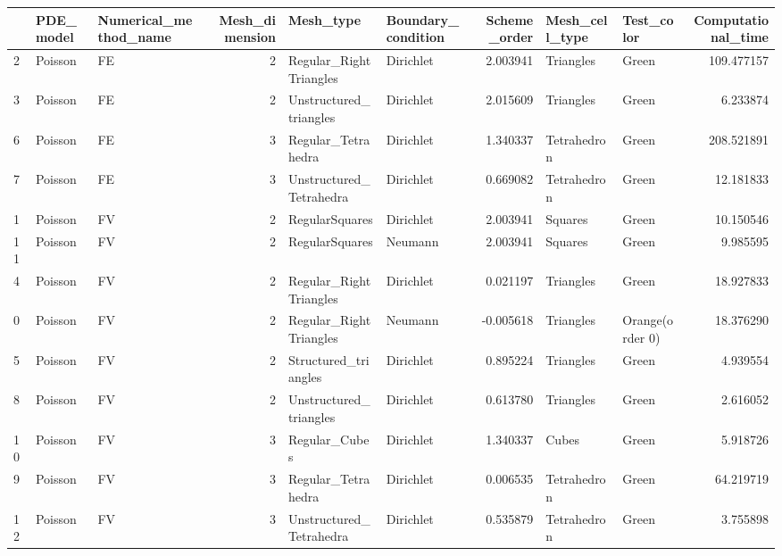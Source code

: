 \begin{tabular}{lllrllrllr}
\toprule
{} & PDE\_model & Numerical\_method\_name &  Mesh\_dimension &                Mesh\_type & Boundary\_condition &  Scheme\_order & Mesh\_cell\_type &       Test\_color &  Computational\_time \\
\midrule
2  &   Poisson &                    FE &               2 &   Regular\_RightTriangles &          Dirichlet &      2.003941 &      Triangles &            Green &          109.477157 \\
3  &   Poisson &                    FE &               2 &   Unstructured\_triangles &          Dirichlet &      2.015609 &      Triangles &            Green &            6.233874 \\
6  &   Poisson &                    FE &               3 &       Regular\_Tetrahedra &          Dirichlet &      1.340337 &    Tetrahedron &            Green &          208.521891 \\
7  &   Poisson &                    FE &               3 &  Unstructured\_Tetrahedra &          Dirichlet &      0.669082 &    Tetrahedron &            Green &           12.181833 \\
1  &   Poisson &                    FV &               2 &           RegularSquares &          Dirichlet &      2.003941 &        Squares &            Green &           10.150546 \\
11 &   Poisson &                    FV &               2 &           RegularSquares &            Neumann &      2.003941 &        Squares &            Green &            9.985595 \\
4  &   Poisson &                    FV &               2 &   Regular\_RightTriangles &          Dirichlet &      0.021197 &      Triangles &            Green &           18.927833 \\
0  &   Poisson &                    FV &               2 &   Regular\_RightTriangles &            Neumann &     -0.005618 &      Triangles &  Orange(order 0) &           18.376290 \\
5  &   Poisson &                    FV &               2 &     Structured\_triangles &          Dirichlet &      0.895224 &      Triangles &            Green &            4.939554 \\
8  &   Poisson &                    FV &               2 &   Unstructured\_triangles &          Dirichlet &      0.613780 &      Triangles &            Green &            2.616052 \\
10 &   Poisson &                    FV &               3 &            Regular\_Cubes &          Dirichlet &      1.340337 &          Cubes &            Green &            5.918726 \\
9  &   Poisson &                    FV &               3 &       Regular\_Tetrahedra &          Dirichlet &      0.006535 &    Tetrahedron &            Green &           64.219719 \\
12 &   Poisson &                    FV &               3 &  Unstructured\_Tetrahedra &          Dirichlet &      0.535879 &    Tetrahedron &            Green &            3.755898 \\
\bottomrule
\end{tabular}
